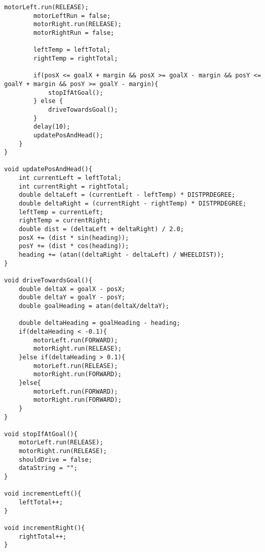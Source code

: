\begin{lstlisting}[caption={Finished arduino code for the project}, label={ArduinoCode}]
		motorLeft.run(RELEASE);
		motorLeftRun = false;
		motorRight.run(RELEASE);
		motorRightRun = false;
		
		leftTemp = leftTotal;
		rightTemp = rightTotal;
		
		if(posX <= goalX + margin && posX >= goalX - margin && posY <= goalY + margin && posY >= goalY - margin){
			stopIfAtGoal();
		} else {
			driveTowardsGoal();  
		}
		delay(10);
		updatePosAndHead();
	}
}

void updatePosAndHead(){
	int currentLeft = leftTotal;
	int currentRight = rightTotal;
	double deltaLeft = (currentLeft - leftTemp) * DISTPRDEGREE;
	double deltaRight = (currentRight - rightTemp) * DISTPRDEGREE;
	leftTemp = currentLeft;
	rightTemp = currentRight;
	double dist = (deltaLeft + deltaRight) / 2.0;
	posX += (dist * sin(heading));
	posY += (dist * cos(heading));
	heading += (atan((deltaRight - deltaLeft) / WHEELDIST));
}

void driveTowardsGoal(){
	double deltaX = goalX - posX;
	double deltaY = goalY - posY;
	double goalHeading = atan(deltaX/deltaY);
	
	double deltaHeading = goalHeading - heading;
	if(deltaHeading < -0.1){
		motorLeft.run(FORWARD);
		motorRight.run(RELEASE);
	}else if(deltaHeading > 0.1){
		motorLeft.run(RELEASE);
		motorRight.run(FORWARD);
	}else{
		motorLeft.run(FORWARD);
		motorRight.run(FORWARD);
	}
}

void stopIfAtGoal(){
	motorLeft.run(RELEASE);
	motorRight.run(RELEASE);
	shouldDrive = false;
	dataString = "";
}

void incrementLeft(){
	leftTotal++;
}

void incrementRight(){
	rightTotal++;
}
\end{lstlisting}
